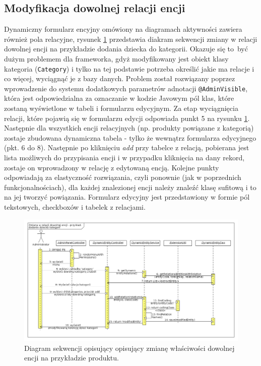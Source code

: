 \subsection{Modyfikacja dowolnej relacji encji}
Dynamiczny formularz encyjny omówiony na diagramach aktywności zawiera również pola relacyjne, rysunek \ref{zmianaWRel} przedstawia diakram sekwencji zmiany w relacji dowolnej encji na przykładzie dodania dziecka do kategorii. Okazuje się to być dużym problemem dla frameworka, gdyż modyfikowany jest obiekt klasy kategoria (\texttt{Category}) i tylko na tej podstawie potrzeba określić jakie ma relacje i co więcej, wyciągnąć je z bazy danych. Problem został rozwiązany poprzez wprowadzenie do systemu dodatkowych parametrów adnotacji \texttt{@AdminVisible}, która jest odpowiedzialna za oznaczanie w kodzie Javowym pól klas, które zostaną wyświetlone w tabeli i formularzu edycyjnym. Za etap wyciągnięcia relacji, które pojawią się w formularzu edycji odpowiada punkt 5 na rysunku \ref{zmianaWRel}. Następnie dla wszystkich encji relacyjnych (np. produkty powiązane z kategorią) zostaje zbudowana dynamiczna tabela - tylko że wewnątrz formularza edycyjnego (pkt. 6 do 8). Następnie po kliknięciu \textit{add} przy tabelce z relacją, pobierana jest lista możliwych do przypisania encji i w przypadku kliknięcia na dany rekord, zostaje on wprowadzony w relację z edytowaną encją. Kolejne punkty odpowiadają za elastyczność rozwiązania, czyli ponownie (jak w poprzednich funkcjonalnościach), dla każdej znalezionej encji należy znaleźć klasę sufitową i to na jej tworzyć powiązania. Formularz edycyjny jest przedstawiony w formie pól tekstowych, checkboxów i tabelek z relacjami.
 \begin{figure}
 	\begin{center}
 		\includegraphics[scale=0.4]{zmianaWRel.png}
 	\end{center}
 	\caption{{\color{black}Diagram sekwencji opisujący opisujący zmianę właściwości dowolnej encji na przykładzie produktu.}} \label{zmianaWRel}
 \end{figure}

